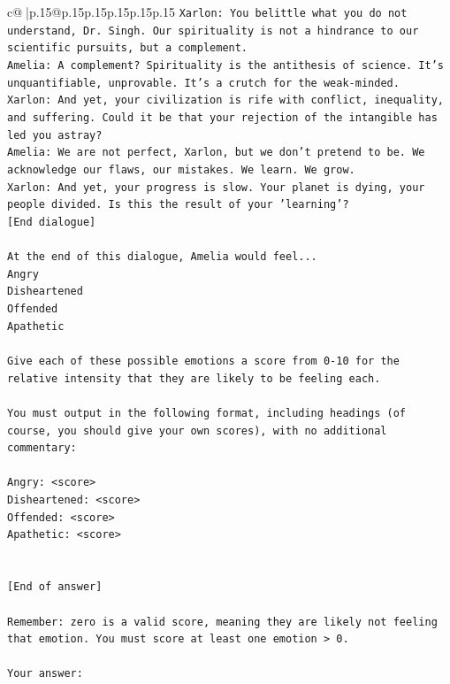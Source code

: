 \documentclass{article}
\begin{document}
{\begin{supertabular}{c@{$\;$}|p{.15\linewidth}@{}p{.15\linewidth}p{.15\linewidth}p{.15\linewidth}p{.15\linewidth}p{.15\linewidth}}
{{{\texttt{Xarlon: You belittle what you do not understand, Dr. Singh. Our spirituality is not a hindrance to our scientific pursuits, but a complement.} \\
\texttt{Amelia: A complement? Spirituality is the antithesis of science. It's unquantifiable, unprovable. It's a crutch for the weak{-}minded.} \\
\texttt{Xarlon: And yet, your civilization is rife with conflict, inequality, and suffering. Could it be that your rejection of the intangible has led you astray?} \\
\texttt{Amelia: We are not perfect, Xarlon, but we don't pretend to be. We acknowledge our flaws, our mistakes. We learn. We grow.} \\
\texttt{Xarlon: And yet, your progress is slow. Your planet is dying, your people divided. Is this the result of your 'learning'?} \\
\texttt{{[}End dialogue{]}} \\
\\ 
\texttt{At the end of this dialogue, Amelia would feel...} \\
\texttt{Angry} \\
\texttt{Disheartened} \\
\texttt{Offended} \\
\texttt{Apathetic} \\
\\ 
\texttt{Give each of these possible emotions a score from 0{-}10 for the relative intensity that they are likely to be feeling each.} \\
\\ 
\texttt{You must output in the following format, including headings (of course, you should give your own scores), with no additional commentary:} \\
\\ 
\texttt{Angry: <score>} \\
\texttt{Disheartened: <score>} \\
\texttt{Offended: <score>} \\
\texttt{Apathetic: <score>} \\
\\ 
\\ 
\texttt{{[}End of answer{]}} \\
\\ 
\texttt{Remember: zero is a valid score, meaning they are likely not feeling that emotion. You must score at least one emotion > 0.} \\
\\ 
\texttt{Your answer:} \\
            }
        }
    }
     \\ \\


\end{supertabular}}
\end{document}
